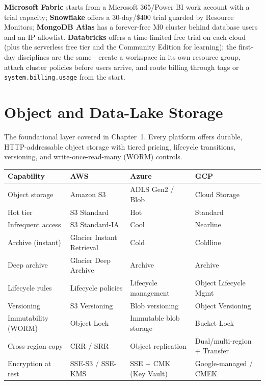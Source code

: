 \noindent \textbf{Microsoft Fabric} starts from a Microsoft 365/Power BI work account with a trial
capacity; \textbf{Snowflake} offers a 30-day/\$400 trial guarded by Resource Monitors;
\textbf{MongoDB Atlas} has a forever-free M0 cluster behind database users and an IP allowlist.
\textbf{Databricks} offers a time-limited free trial on each cloud (plus the serverless free
tier and the Community Edition for learning); the first-day disciplines are the same---create a
workspace in its own resource group, attach cluster policies before users arrive, and route
billing through tags or \texttt{system.billing.usage} from the start.

\section{Object and Data-Lake Storage}
%
The foundational layer covered in Chapter~1. Every platform offers durable, HTTP-addressable
object storage with tiered pricing, lifecycle transitions, versioning, and write-once-read-many
(WORM) controls.

\begin{center}
\footnotesize
\begin{tabular}{@{}p{2.8cm}p{3.2cm}p{3.2cm}p{3.2cm}@{}}
\toprule
\textbf{Capability} & \textbf{AWS} & \textbf{Azure} & \textbf{GCP} \\
\midrule
Object storage & Amazon S3 & ADLS Gen2 / Blob & Cloud Storage \\
Hot tier & S3 Standard & Hot & Standard \\
Infrequent access & S3 Standard-IA & Cool & Nearline \\
Archive (instant) & Glacier Instant Retrieval & Cold & Coldline \\
Deep archive & Glacier Deep Archive & Archive & Archive \\
Lifecycle rules & Lifecycle policies & Lifecycle management & Object Lifecycle Mgmt \\
Versioning & S3 Versioning & Blob versioning & Object Versioning \\
Immutability (WORM) & Object Lock & Immutable blob storage & Bucket Lock \\
Cross-region copy & CRR / SRR & Object replication & Dual/multi-region + Transfer \\
Encryption at rest & SSE-S3 / SSE-KMS & SSE + CMK (Key Vault) & Google-managed / CMEK \\
\bottomrule
\end{tabular}
\end{center}

